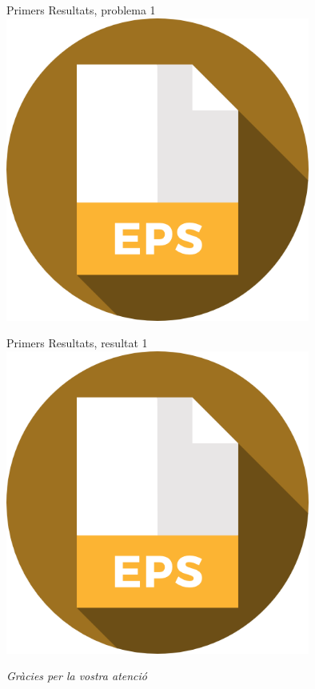 \documentclass[twocolumn]{beamer}
\begin{document}
\begin{frame}{Primers Resultats, problema 1}
\centering
\includegraphics[width=10cm]{eps}
\end{frame}
\begin{frame}{Primers Resultats, resultat 1}
\centering
\includegraphics[width=10cm]{eps}
\end{frame}

\begin{frame}
\textit{\color{redviolet} \Huge Gràcies per la vostra atenció}
\end{frame}
\end{document}
